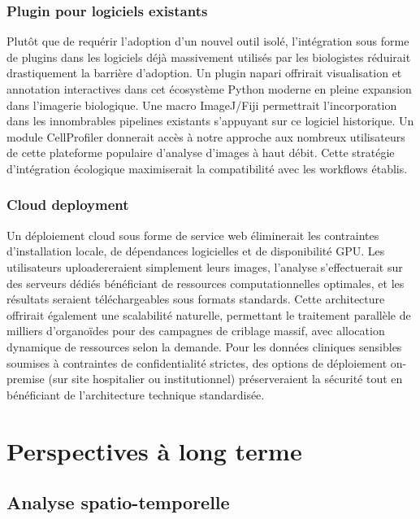 \subsubsection{Plugin pour logiciels existants}

Plutôt que de requérir l'adoption d'un nouvel outil isolé, l'intégration sous forme de plugins dans les logiciels déjà massivement utilisés par les biologistes réduirait drastiquement la barrière d'adoption. Un plugin napari offrirait visualisation et annotation interactives dans cet écosystème Python moderne en pleine expansion dans l'imagerie biologique. Une macro ImageJ/Fiji permettrait l'incorporation dans les innombrables pipelines existants s'appuyant sur ce logiciel historique. Un module CellProfiler donnerait accès à notre approche aux nombreux utilisateurs de cette plateforme populaire d'analyse d'images à haut débit. Cette stratégie d'intégration écologique maximiserait la compatibilité avec les workflows établis.

\subsubsection{Cloud deployment}

Un déploiement cloud sous forme de service web éliminerait les contraintes d'installation locale, de dépendances logicielles et de disponibilité GPU. Les utilisateurs uploadereraient simplement leurs images, l'analyse s'effectuerait sur des serveurs dédiés bénéficiant de ressources computationnelles optimales, et les résultats seraient téléchargeables sous formats standards. Cette architecture offrirait également une scalabilité naturelle, permettant le traitement parallèle de milliers d'organoïdes pour des campagnes de criblage massif, avec allocation dynamique de ressources selon la demande. Pour les données cliniques sensibles soumises à contraintes de confidentialité strictes, des options de déploiement on-premise (sur site hospitalier ou institutionnel) préserveraient la sécurité tout en bénéficiant de l'architecture technique standardisée.

\section{Perspectives à long terme}

\subsection{Analyse spatio-temporelle}

